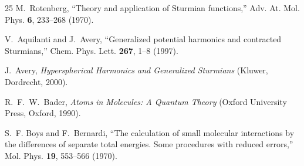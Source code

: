 \documentclass[aps,pra,twocolumn,superscriptaddress,longbibliography]{revtex4-2}
\begin{document}
\begin{thebibliography}{25}
M.~Rotenberg,
``Theory and application of Sturmian functions,''
Adv. At. Mol. Phys. \textbf{6}, 233--268 (1970).

V.~Aquilanti and J.~Avery,
``Generalized potential harmonics and contracted Sturmians,''
Chem. Phys. Lett. \textbf{267}, 1--8 (1997).

J.~Avery,
\textit{Hyperspherical Harmonics and Generalized Sturmians}
(Kluwer, Dordrecht, 2000).

R.~F.~W.~Bader,
\textit{Atoms in Molecules: A Quantum Theory}
(Oxford University Press, Oxford, 1990).

S.~F. Boys and F.~Bernardi,
``The calculation of small molecular interactions by the differences
of separate total energies. Some procedures with reduced errors,''
Mol. Phys. \textbf{19}, 553--566 (1970).

\end{thebibliography}
\end{document}
